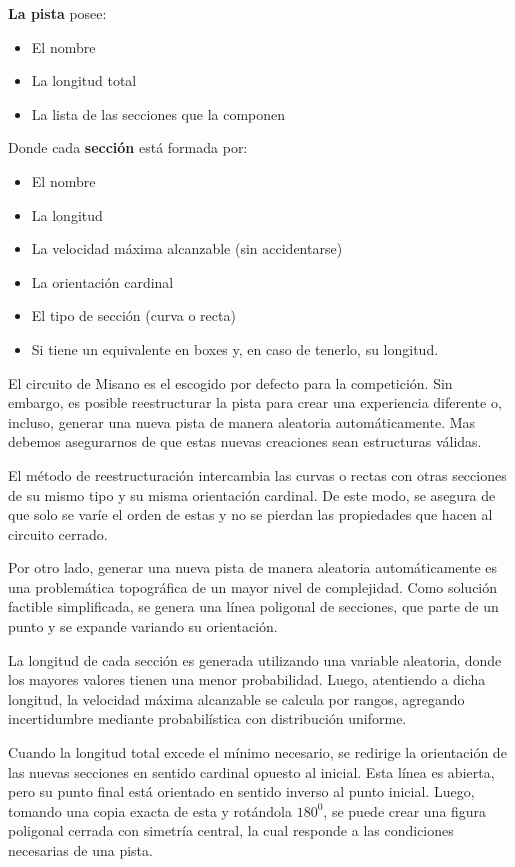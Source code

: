 \documentclass[12pt, letterpaper,spanish]{article}
\theoremstyle{definition}
\theoremstyle{remark}
\begin{document}
		\textbf{La pista} posee:
		\begin{itemize}
    		\item El nombre
		\item La longitud total
		\item La lista de las secciones que la componen
		\end{itemize}

		Donde cada \textbf{sección} está formada por:
		\begin{itemize}
    		\item El nombre
    		\item La longitud
		\item La velocidad máxima alcanzable (sin accidentarse)
		\item La orientación cardinal
		\item El tipo de sección (curva o recta)
		\item Si tiene un equivalente en boxes y, en caso de tenerlo, su longitud.
		\end{itemize}
		
		El circuito de Misano es el escogido por defecto para la competición. Sin embargo, es posible reestructurar la pista para crear una experiencia diferente o, incluso, generar una nueva pista de manera aleatoria automáticamente. Mas debemos asegurarnos de que estas nuevas creaciones sean estructuras válidas.

		El método de reestructuración intercambia las curvas o rectas con otras secciones de su mismo tipo y su misma orientación cardinal. De este modo, se asegura de que solo se varíe el orden de estas y no se pierdan las propiedades que hacen al circuito cerrado.

		Por otro lado, generar una nueva pista de manera aleatoria automáticamente es una problemática topográfica de un mayor nivel de complejidad. Como solución factible simplificada, se genera una línea poligonal de secciones, que parte de un punto y se expande variando su orientación. 

		La longitud de cada sección es generada utilizando una variable aleatoria, donde los mayores valores tienen una menor probabilidad. Luego, atentiendo a dicha longitud, la velocidad máxima alcanzable se calcula por rangos, agregando incertidumbre mediante probabilística con distribución uniforme.

		Cuando la longitud total excede el mínimo necesario, se redirige la orientación de las nuevas secciones en sentido cardinal opuesto al inicial. Esta línea es abierta, pero su punto final está orientado en sentido inverso al punto inicial. Luego, tomando una copia exacta de esta y rotándola $180^0$, se puede crear una figura poligonal cerrada con simetría central, la cual responde a las condiciones necesarias de una pista.
\end{document}
